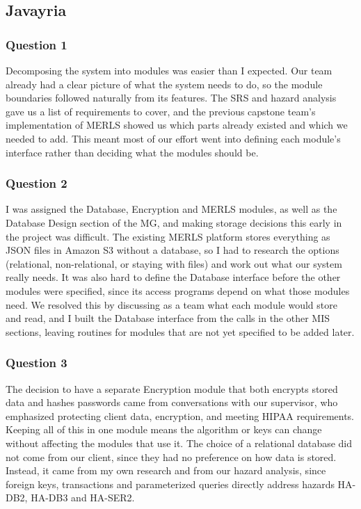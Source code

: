 \documentclass[12pt, titlepage]{article}
\begin{document}
\begin{enumerate}
\subsection*{Javayria}
\subsubsection*{Question 1}
Decomposing the system into modules was easier than I expected. Our team already had a clear picture of what the system needs to do, so the module boundaries followed naturally from its features. The SRS and hazard analysis gave us a list of requirements to cover, and the previous capstone team's implementation of MERLS showed us which parts already existed and which we needed to add. This meant most of our effort went into defining each module's interface rather than deciding what the modules should be.

\subsubsection*{Question 2}
I was assigned the Database, Encryption and MERLS modules, as well as the Database Design section of the MG, and making storage decisions this early in the project was difficult. The existing MERLS platform stores everything as JSON files in Amazon S3 without a database, so I had to research the options (relational, non-relational, or staying with files) and work out what our system really needs. It was also hard to define the Database interface before the other modules were specified, since its access programs depend on what those modules need. We resolved this by discussing as a team what each module would store and read, and I built the Database interface from the calls in the other MIS sections, leaving routines for modules that are not yet specified to be added later.

\subsubsection*{Question 3}
The decision to have a separate Encryption module that both encrypts stored data and hashes passwords came from conversations with our supervisor, who emphasized protecting client data, encryption, and meeting HIPAA requirements. Keeping all of this in one module means the algorithm or keys can change without affecting the modules that use it. The choice of a relational database did not come from our client, since they had no preference on how data is stored. Instead, it came from my own research and from our hazard analysis, since foreign keys, transactions and parameterized queries directly address hazards HA-DB2, HA-DB3 and HA-SER2.


\end{enumerate}
\end{document}
